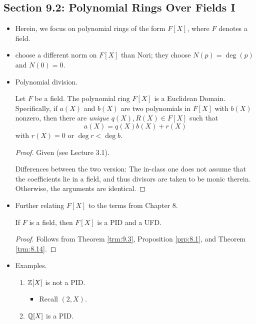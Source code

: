 \documentclass[../notes.tex]{subfiles}
\begin{document}
\subsection*{Section 9.2: Polynomial Rings Over Fields I}
\begin{itemize}
    \item Herein, we focus on polynomial rings of the form $F[X]$, where $F$ denotes a field.
    \item \textcite{bib:DummitFoote} choose a different norm on $F[X]$ than Nori; they choose $N(p)=\deg(p)$ and $N(0)=0$.
    \item Polynomial division.
    \begin{theorem}\label{trm:9.3}
        Let $F$ be a field. The polynomial ring $F[X]$ is a Euclidean Domain. Specifically, if $a(X)$ and $b(X)$ are two polynomials in $F[X]$ with $b(X)$ nonzero, then there are \emph{unique} $q(X),R(X)\in F[X]$ such that
        \begin{equation*}
            a(X) = q(X)b(X)+r(X)
        \end{equation*}
        with $r(X)=0$ or $\deg r<\deg b$.
        \begin{proof}
            Given (see Lecture 3.1).\par
            Differences between the two version: The in-class one does not assume that the coefficients lie in a field, and thus divisors are taken to be monic therein. Otherwise, the arguments are identical.
        \end{proof}
    \end{theorem}
    \item Further relating $F[X]$ to the terms from Chapter 8.
    \begin{corollary}\label{cly:9.4}
        If $F$ is a field, then $F[X]$ is a PID and a UFD.
        \begin{proof}
            Follows from Theorem \ref{trm:9.3}, Proposition \ref{prp:8.1}, and Theorem \ref{trm:8.14}.
        \end{proof}
    \end{corollary}
    \item Examples.
    \begin{enumerate}
        \item $\mathbb{Z}[X]$ is not a PID.
        \begin{itemize}
            \item Recall $(2,X)$.
        \end{itemize}
        \item $\mathbb{Q}[X]$ is a PID.

\end{enumerate}
\end{itemize}
\end{document}
